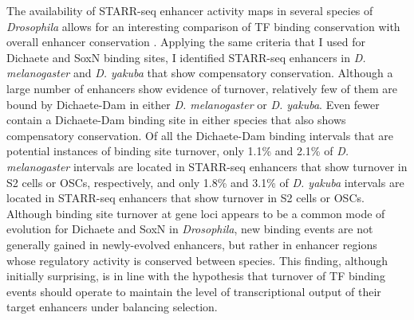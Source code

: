 The availability of STARR-seq enhancer activity maps in several species of \emph{Drosophila} allows for an interesting comparison of TF binding conservation with overall enhancer conservation \citep{arnold_genome-wide_2013}. Applying the same criteria that I used for Dichaete and SoxN binding sites, I identified STARR-seq enhancers in \emph{D. melanogaster} and \emph{D. yakuba} that show compensatory conservation. Although a large number of enhancers show evidence of turnover, relatively few of them are bound by Dichaete-Dam in either \emph{D. melanogaster} or \emph{D. yakuba}. Even fewer contain a Dichaete-Dam binding site in either species that also shows compensatory conservation. Of all the Dichaete-Dam binding intervals that are potential instances of binding site turnover, only 1.1\% and 2.1\% of \emph{D. melanogaster} intervals are located in STARR-seq enhancers that show turnover in S2 cells or OSCs, respectively, and only 1.8\% and 3.1\% of \emph{D. yakuba} intervals are located in STARR-seq enhancers that show turnover in S2 cells or OSCs. Although binding site turnover at gene loci appears to be a common mode of evolution for Dichaete and SoxN in \emph{Drosophila}, new binding events are not generally gained in newly-evolved enhancers, but rather in enhancer regions whose regulatory activity is conserved between species. This finding, although initially surprising, is in line with the hypothesis that turnover of TF binding events should operate to maintain the level of transcriptional output of their target enhancers under balancing selection.

